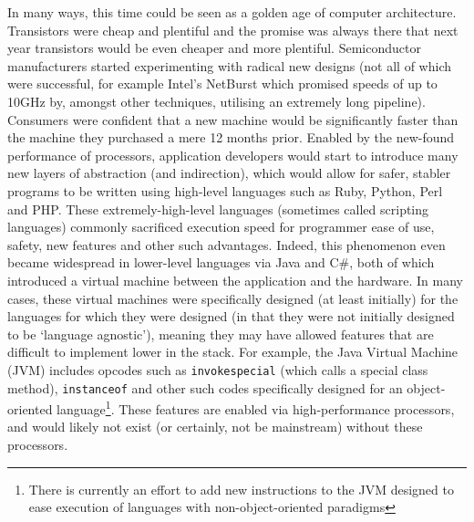 In many ways, this time could be seen as a golden age of computer architecture. Transistors were cheap and plentiful and the promise was always there that next year transistors would be even cheaper and more plentiful. Semiconductor manufacturers started experimenting with radical new designs (not all of which were successful, for example Intel's NetBurst which promised speeds of up to 10GHz by, amongst other techniques, utilising an extremely long pipeline). Consumers were confident that a new machine would be significantly faster than the machine they purchased a mere 12 months prior. Enabled by the new-found performance of processors, application developers would start to introduce many new layers of abstraction (and indirection), which would allow for safer, stabler programs to be written using high-level languages such as Ruby, Python, Perl and PHP. These extremely-high-level languages (sometimes called scripting languages) commonly sacrificed execution speed for programmer ease of use, safety, new features and other such advantages. Indeed, this phenomenon even became widespread in lower-level languages via Java and C\#, both of which introduced a virtual machine between the application and the hardware. In many cases, these virtual machines were specifically designed (at least initially) for the languages for which they were designed (in that they were not initially designed to be `language agnostic'), meaning they may have allowed features that are difficult to implement lower in the stack. For example, the Java Virtual Machine (JVM) includes opcodes such as \texttt{invokespecial} (which calls a special class method), \texttt{instanceof} and other such codes specifically designed for an object-oriented language\footnote{There is currently an effort to add new instructions to the JVM designed to ease execution of languages with non-object-oriented paradigms}. These features are enabled via high-performance processors, and would likely not exist (or certainly, not be mainstream) without these processors.

